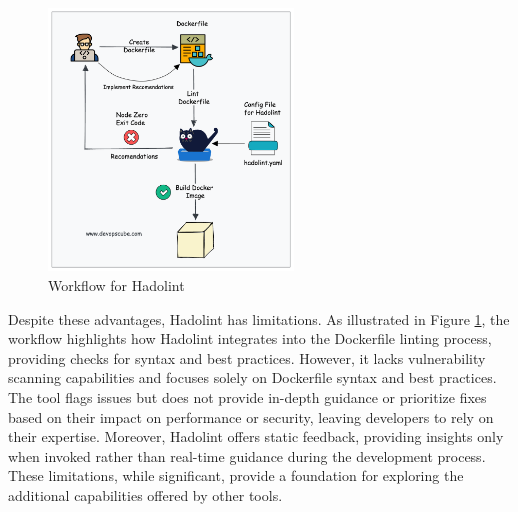 \begin{figure}[ht]
  \centering
   \includegraphics[width=0.58\textwidth]{Figures/hadolint-workflow.png}
  \caption{Workflow for Hadolint \cite{wilson_2023}} %
  \label{fig:2.5} %
\end{figure} 

Despite these advantages, Hadolint has limitations. As illustrated in Figure \ref{fig:2.5}, the workflow highlights how Hadolint integrates into the Dockerfile linting process, providing checks for syntax and best practices. However, it lacks vulnerability scanning capabilities and focuses solely on Dockerfile syntax and best practices. The tool flags issues but does not provide in-depth guidance or prioritize fixes based on their impact on performance or security, leaving developers to rely on their expertise. Moreover, Hadolint offers static feedback, providing insights only when invoked rather than real-time guidance during the development process. These limitations, while significant, provide a foundation for exploring the additional capabilities offered by other tools.


